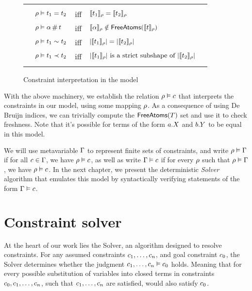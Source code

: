 \documentclass[english, mgr]{iithesis}
\renewcommand{\it}[1]{\textit{#1}}
\begin{document}
\begin{figure}[htbp]
  \centering
    \begin{tabularx}{\textwidth}{|XlclX|}
      \hline & & & & \\
      & $\rho \vDash t_1 = t_2 $  & \textrm{iff} &
        $\llbracket t_1 \rrbracket_{\rho} = \llbracket t_2 \rrbracket_{\rho}$ & \\
      & $\rho \vDash \alpha \,\#\, t$ & \textrm{iff} &
        $\llbracket \alpha \rrbracket_{\rho} \notin
          \mathsf{FreeAtoms}(\llbracket t \rrbracket_{\rho})$ & \\
      & $\rho \vDash t_1 \sim t_2$ & \textrm{iff} &
        $|\llbracket t_1 \rrbracket_{\rho}| = |\llbracket t_2 \rrbracket_{\rho}|$ & \\
      & $\rho \vDash t_1 \prec t_2$ & \textrm{iff} &
        $|\llbracket t_1 \rrbracket_{\rho}| \textrm{ is a strict subshape of }
          |\llbracket t_2 \rrbracket_{\rho}|$ & \\
      & & & & \\ \hline
    \end{tabularx}
  \caption{Constraint interpretation in the model}
  \label{fig:constraint-interpretation}
\end{figure}
With the above machinery, we establish the relation $\rho \vDash c$
that interprets the constraints in our model, using some mapping $\rho$.
As a consequence of using De Bruijn indices, we can trivially compute the
$\mathsf{FreeAtoms}(T)$ set and use it to check freshness.
Note that it's possible for terms of the form $a.{X}$ and $b.{Y}$
to be equal in this model.

\pagebreak

We will use metavariable $\Gamma$ to represent finite sets of constraints,
and write $\rho \vDash \Gamma$ if for all $c \in \Gamma$,
we have $\rho \vDash c$,
as well as write $\Gamma \vDash c$ if for every $\rho$ such that $\rho \vDash \Gamma$,
we have $\rho \vDash c$.
In the next chapter, we present the deterministic \it{Solver} algorithm
that emulates this model by syntactically verifying statements of the form $\Gamma \vDash c$.

\chapter{Constraint solver} \label{sec:solver}
At the heart of our work lies the Solver, an algorithm designed to resolve constraints.
For any assumed constraints $c_1, \dots, c_n$, and
goal constraint $c_0$, the Solver determines whether the judgment $c_1, \dots, c_n \vDash c_0$ holds.
Meaning that for every possible substitution of variables into closed terms in constraints $c_0, c_1, \dots, c_n$,
such that $c_1, \dots, c_n$ are satisfied, would also satisfy $c_0$.
\end{document}
